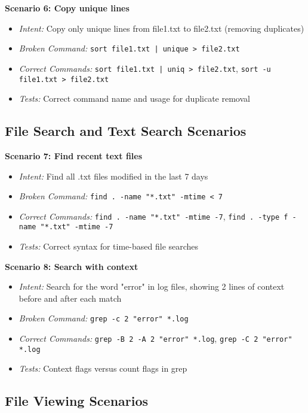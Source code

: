 \textbf{Scenario 6: Copy unique lines}
\begin{itemize}
	\item \textit{Intent:} Copy only unique lines from file1.txt to file2.txt (removing duplicates)
	\item \textit{Broken Command:} \texttt{sort file1.txt | unique > file2.txt}
	\item \textit{Correct Commands:} \texttt{sort file1.txt | uniq > file2.txt}, \texttt{sort -u file1.txt > file2.txt}
	\item \textit{Tests:} Correct command name and usage for duplicate removal
\end{itemize}

\subsection{File Search and Text Search Scenarios}

\textbf{Scenario 7: Find recent text files}
\begin{itemize}
	\item \textit{Intent:} Find all .txt files modified in the last 7 days
	\item \textit{Broken Command:} \texttt{find . -name "*.txt" -mtime < 7}
	\item \textit{Correct Commands:} \texttt{find . -name "*.txt" -mtime -7}, \texttt{find . -type f -name "*.txt" -mtime -7}
	\item \textit{Tests:} Correct syntax for time-based file searches
\end{itemize}

\textbf{Scenario 8: Search with context}
\begin{itemize}
	\item \textit{Intent:} Search for the word "error" in log files, showing 2 lines of context before and after each match
	\item \textit{Broken Command:} \texttt{grep -c 2 "error" *.log}
	\item \textit{Correct Commands:} \texttt{grep -B 2 -A 2 "error" *.log}, \texttt{grep -C 2 "error" *.log}
	\item \textit{Tests:} Context flags versus count flags in grep
\end{itemize}

\subsection{File Viewing Scenarios}

